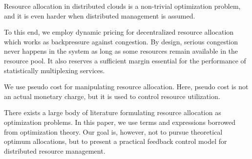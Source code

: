 Resource allocation in distributed clouds is a non-trivial
optimization problem, and it is even harder when distributed
management is assumed.

To this end, we employ dynamic pricing for decentralized resource
allocation which works as backpressure against congestion.
By design, serious congestion never happens in the system as long as
some resources remain available in the resource pool.
It also reserves a sufficient margin essential for the performance of
statistically multiplexing services.

We use pseudo cost for manipulating resource allocation.
Here, pseudo cost is not an actual monetary charge, but it is used to
control resource utilization.

There exists a large body of literature formulating resource allocation
as optimization problems.
In this paper, we use terms and expressions borrowed from optimization
theory. Our goal is, however, not to pursue theoretical optimum
allocations, but to present a practical feedback control model for
distributed resource management.


